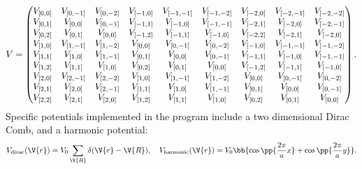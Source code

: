 \documentclass[main.tex]{subfiles}
\begin{document}
	\begin{equation}
		V = \begin{pmatrix}
			V_{[0, 0]}	& V_{[0, -1]}	& V_{[0, -2]}	& V_{[-1, 0]}		& V_{[-1, -1]}	& V_{[-1, -2]}	& V_{[-2, 0]}	& V_{[-2, -1]}	& V_{[-2, -2]} \\
			
			V_{[0, 1]}	& V_{[0, 0]}	& V_{[0, -1]}	& V_{[-1, 1]}		& V_{[-1, 0]}		& V_{[-1, -1]}	& V_{[-2, 1]}	& V_{[-2, 0]}		& V_{[-2, -1]} \\
			
			V_{[0, 2]}	& V_{[0, 1]}	& V_{[0, 0]}	& V_{[-1, 2]}		& V_{[-1, 1]} 	& V_{[-1, 0]}	& V_{[-2, 2]}	& V_{[-2, 1]}		& V_{[-2, 0]} \\
			
			V_{[1, 0]}	& V_{[1, -1]}	& V_{[1, -2]}	& V_{[0, 0]}		& V_{[0, -1]}		& V_{[0, -2]}	& V_{[-1, 0]}	& V_{[-1, -1]}	& V_{[-1, -2]} \\
			
			V_{[1, 1]} 	& V_{[1, 0]}	& V_{[1, -1]}	& V_{[0, 1]}		& V_{[0, 0]}		& V_{[0,-1]}	& V_{[-1, 1]}	& V_{[-1, 0]}		& V_{[-1, -1]} \\
			
			V_{[1, 2]}	& V_{[1, 1]}	& V_{[1, 0]}	& V_{[0, 2]}		& V_{[0, 1]}		& V_{[0, 0]}	& V_{[-1, 2]}	& V_{[-1, 1]}		& V_{[-1, 0]} \\
			
			V_{[2, 0]}	& V_{[2, -1]}	& V_{[2, -2]}	& V_{[1, 0]}		& V_{[1, -1]}		& V_{[1, -2]}	& V_{[0, 0]}	& V_{[0, -1]}		& V_{[0, -2]} \\
			
			V_{[2, 1]}	& V_{[2, 0]}	& V_{[2, -1]}	& V_{[1, 1]}		& V_{[1, 0]}		& V_{[1, -1]}	& V_{[0, 1]}	& V_{[0, 0]}		& V_{[0, -1]} \\
			
			V_{[2, 2]}	& V_{[2, 1]}	& V_{[2, 0]}	& V_{[1, 2]}		& V_{[1, 1]}		& V_{[1, 0]}	& V_{[0, 2]}	& V_{[0, 1]}		& V_{[0, 0]}
		\end{pmatrix}.
	\end{equation}
	Specific potentials implemented in the program include a two dimensional Dirac Comb, and a harmonic potential:
	\begin{equation}
		V_{\text{dirac}}(\V{r}) = V_0 \sum_{\V{R}} \delta(\V{r}-\V{R}), \quad V_{\text{harmonic}}(\V{r}) = V_0 \bb{\cos\pp{\frac{2\pi}{a} x} + \cos\pp{\frac{2\pi}{a} y}}.
	\end{equation}
\end{document}
